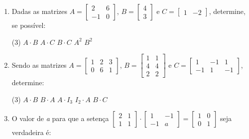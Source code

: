 \begin{enumerate}[label*=\protect\fbox{\arabic{enumi}}]
	\item{ Dadas as matrizes $A = \begin{bmatrix}
			            2  & 6 \\
			            -1 & 0
		            \end{bmatrix}$, $B = \begin{bmatrix}
			            4 \\
			            3
		            \end{bmatrix}$ e $C = \begin{bmatrix}
			            1 & -2
		            \end{bmatrix}$, determine, se possível:

	            \begin{tasks}(3)
		            \task $A \cdot B$
		            \task $A \cdot C$
		            \task $B \cdot C$
		            \task $A^2$
		            \task $B^2$
	            \end{tasks}
	      }
	\item {
	      Sendo as matrizes $A = \begin{bmatrix}
			      1 & 2 & 3 \\
			      0 & 6 & 1
		      \end{bmatrix}$, $B = \begin{bmatrix}
			      1 & 1 \\
			      4 & 4 \\
			      2 & 2
		      \end{bmatrix}$ e $C = \begin{bmatrix}
			      1  & -1 & 1  \\
			      -1 & 1  & -1
		      \end{bmatrix}$, determine:

	      \begin{tasks}(3)
		      \task $A \cdot B$
		      \task $B \cdot A$
		      \task $A \cdot I_3$
		      \task $I_2 \cdot A$
		      \task $B \cdot C$
	      \end{tasks}
	      }

	      \item{
	                  O valor de \textit{a} para que a setença $\begin{bmatrix}
			                  2 & 1 \\
			                  1 & 1
		                  \end{bmatrix} \cdot  \begin{bmatrix}
			                  1  & -1 \\
			                  -1 & a
		                  \end{bmatrix} = \begin{bmatrix}
			                  1 & 0 \\
			                  0 & 1
		                  \end{bmatrix}$ seja verdadeira é:

}
\end{enumerate}
